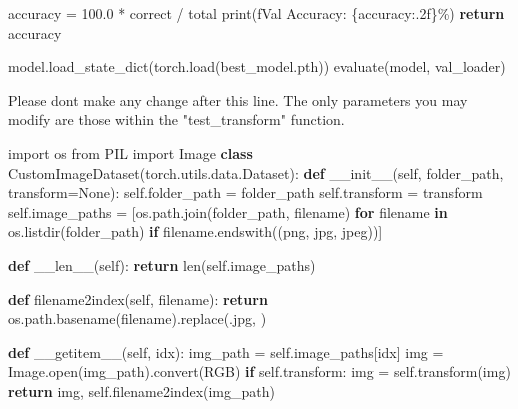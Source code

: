 \documentclass[
  letterpaper,
  DIV=11,
  numbers=noendperiod]{scrartcl}
\newenvironment{Shaded}{\begin{snugshade}}{\end{snugshade}}
\newcommand{\BuiltInTok}[1]{\textcolor[rgb]{0.00,0.23,0.31}{#1}}
\newcommand{\ControlFlowTok}[1]{\textcolor[rgb]{0.00,0.23,0.31}{\textbf{#1}}}
\newcommand{\ErrorTok}[1]{\textcolor[rgb]{0.68,0.00,0.00}{#1}}
\newcommand{\FloatTok}[1]{\textcolor[rgb]{0.68,0.00,0.00}{#1}}
\newcommand{\FunctionTok}[1]{\textcolor[rgb]{0.28,0.35,0.67}{#1}}
\newcommand{\ImportTok}[1]{\textcolor[rgb]{0.00,0.46,0.62}{#1}}
\newcommand{\KeywordTok}[1]{\textcolor[rgb]{0.00,0.23,0.31}{\textbf{#1}}}
\newcommand{\NormalTok}[1]{\textcolor[rgb]{0.00,0.23,0.31}{#1}}
\newcommand{\OperatorTok}[1]{\textcolor[rgb]{0.37,0.37,0.37}{#1}}
\newcommand{\SpecialCharTok}[1]{\textcolor[rgb]{0.37,0.37,0.37}{#1}}
\newcommand{\SpecialStringTok}[1]{\textcolor[rgb]{0.13,0.47,0.30}{#1}}
\newcommand{\StringTok}[1]{\textcolor[rgb]{0.13,0.47,0.30}{#1}}
\newcommand{\VariableTok}[1]{\textcolor[rgb]{0.07,0.07,0.07}{#1}}
\begin{document}
\begin{Shaded}
\begin{Highlighting}[]
\NormalTok{    accuracy }\OperatorTok{=} \FloatTok{100.0} \OperatorTok{*}\NormalTok{ correct }\OperatorTok{/}\NormalTok{ total}
    \BuiltInTok{print}\NormalTok{(}\SpecialStringTok{f\textquotesingle{}Val Accuracy: }\SpecialCharTok{\{}\NormalTok{accuracy}\SpecialCharTok{:.2f\}}\SpecialStringTok{\%\textquotesingle{}}\NormalTok{)}
    \ControlFlowTok{return}\NormalTok{ accuracy}

\NormalTok{model.load\_state\_dict(torch.load(}\StringTok{\textquotesingle{}best\_model.pth\textquotesingle{}}\NormalTok{))}
\NormalTok{evaluate(model, val\_loader)}

\NormalTok{Please don}\StringTok{\textquotesingle{}t make any change after this line. The only parameters you may modify are those within the "test\_transform" function.}

\ErrorTok{import os}
\ImportTok{from}\NormalTok{ PIL }\ImportTok{import}\NormalTok{ Image}
\KeywordTok{class}\NormalTok{ CustomImageDataset(torch.utils.data.Dataset):}
    \KeywordTok{def} \FunctionTok{\_\_init\_\_}\NormalTok{(}\VariableTok{self}\NormalTok{, folder\_path, transform}\OperatorTok{=}\VariableTok{None}\NormalTok{):}
        \VariableTok{self}\NormalTok{.folder\_path }\OperatorTok{=}\NormalTok{ folder\_path}
        \VariableTok{self}\NormalTok{.transform }\OperatorTok{=}\NormalTok{ transform}
        \VariableTok{self}\NormalTok{.image\_paths }\OperatorTok{=}\NormalTok{ [os.path.join(folder\_path, filename) }\ControlFlowTok{for}\NormalTok{ filename }\KeywordTok{in}\NormalTok{ os.listdir(folder\_path) }\ControlFlowTok{if}\NormalTok{ filename.endswith((}\StringTok{\textquotesingle{}png\textquotesingle{}}\NormalTok{, }\StringTok{\textquotesingle{}jpg\textquotesingle{}}\NormalTok{, }\StringTok{\textquotesingle{}jpeg\textquotesingle{}}\NormalTok{))]}

    \KeywordTok{def} \FunctionTok{\_\_len\_\_}\NormalTok{(}\VariableTok{self}\NormalTok{):}
        \ControlFlowTok{return} \BuiltInTok{len}\NormalTok{(}\VariableTok{self}\NormalTok{.image\_paths)}

    \KeywordTok{def}\NormalTok{ filename2index(}\VariableTok{self}\NormalTok{, filename):}
        \ControlFlowTok{return}\NormalTok{ os.path.basename(filename).replace(}\StringTok{\textquotesingle{}.jpg\textquotesingle{}}\NormalTok{, }\StringTok{\textquotesingle{}\textquotesingle{}}\NormalTok{)}

    \KeywordTok{def} \FunctionTok{\_\_getitem\_\_}\NormalTok{(}\VariableTok{self}\NormalTok{, idx):}
\NormalTok{        img\_path }\OperatorTok{=} \VariableTok{self}\NormalTok{.image\_paths[idx]}
\NormalTok{        img }\OperatorTok{=}\NormalTok{ Image.}\BuiltInTok{open}\NormalTok{(img\_path).convert(}\StringTok{\textquotesingle{}RGB\textquotesingle{}}\NormalTok{)}
        \ControlFlowTok{if} \VariableTok{self}\NormalTok{.transform:}
\NormalTok{            img }\OperatorTok{=} \VariableTok{self}\NormalTok{.transform(img)}
        \ControlFlowTok{return}\NormalTok{ img, }\VariableTok{self}\NormalTok{.filename2index(img\_path)}


\end{Highlighting}
\end{Shaded}
\end{document}
